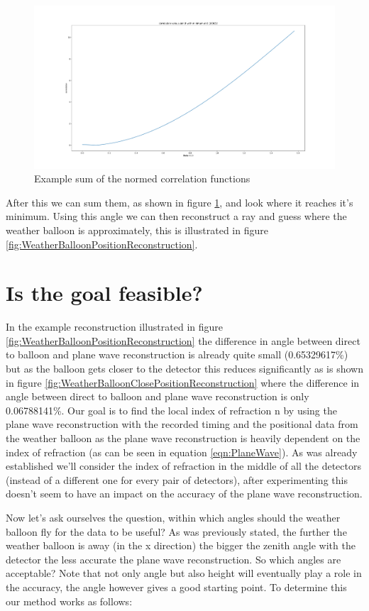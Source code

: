 \documentclass[11pt,a4paper,faculty=we,language=en,doctype=report]{cls/ugent-doc}
\begin{document}
\begin{figure}
	\centering
	\includegraphics[width=\textwidth]{SummedCorrelation.pdf}
	\caption{Example sum of the normed correlation functions}
	\label{fig:SummedCorrelation}
\end{figure}
After this we can sum them, as shown in figure \ref{fig:SummedCorrelation}, and look
where it reaches it's minimum. Using this angle we can then reconstruct a ray and guess 
where the weather balloon is approximately, this is illustrated in figure 
\ref{fig:WeatherBalloonPositionReconstruction}. 
\section{Is the goal feasible?}
In the example reconstruction illustrated in figure
\ref{fig:WeatherBalloonPositionReconstruction} the difference in angle between
direct to balloon and plane wave reconstruction is already quite small
(0.65329617\%) but as the balloon gets closer to the detector this reduces
significantly as is shown in figure
\ref{fig:WeatherBalloonClosePositionReconstruction} where the difference in
angle between direct to balloon and plane wave reconstruction is only
0.06788141\%. Our goal is to find the local index of refraction n by using the
plane wave reconstruction with the recorded timing and the positional data from
the weather balloon as the plane wave reconstruction is heavily dependent on
the index of refraction (as can be seen in equation \ref{eqn:PlaneWave}). As
was already established we'll consider the index of refraction in the middle of
all the detectors (instead of a different one for every pair of detectors),
after experimenting this doesn't seem to have an impact on the accuracy of the
plane wave reconstruction. 

Now let's ask ourselves the question, within which angles should the
weather balloon fly for the data to be useful?  As was previously stated, the
further the weather balloon is away (in the x direction) the bigger the zenith
angle with the detector the less accurate the plane wave reconstruction.  So
which angles are acceptable? Note that not only angle but also height will eventually
play a role in the accuracy, the angle however gives a good starting point.
To determine this our method works as follows: 
\end{document}
